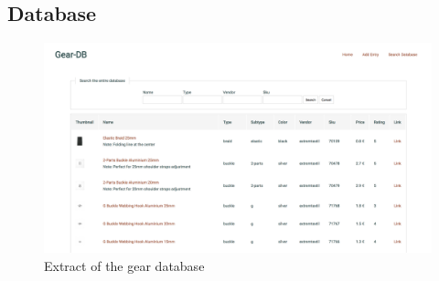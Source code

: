 \subsection{Database}\label{sec:gear-database}

\begin{figure}[H]
  \includegraphics[width=\textwidth]{media/images/gear-database}
  \caption{Extract of the gear database}
\end{figure}
